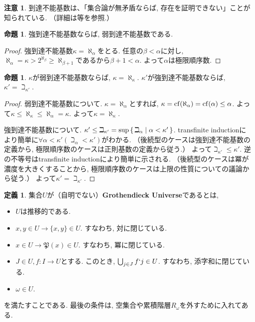\documentclass[a4paper, twoside]{bxjsarticle}
\theoremstyle{definition}
\newtheorem{prop}[thm]{命題}
\newtheorem{defn}[thm]{定義}
\newtheorem{rem}[thm]{注意}
\begin{document}
        \begin{rem}
            到達不能基数は、「集合論が無矛盾ならば, 存在を証明できない」ことが知られている. （詳細は\cite{arai}等を参照.）
        \end{rem}
        \begin{prop}
            強到達不能基数ならば, 弱到達不能基数である. 
        \end{prop}
        \begin{proof}
            強到達不能基数$\kappa=\aleph_\alpha$をとる. 任意の$\beta<\alpha$に対し, $\aleph_\alpha=\kappa>2^{\aleph_\beta}\geq \aleph_{\beta+1}$であるから$\beta+1<\alpha$. よって$\alpha$は極限順序数.     
        \end{proof}
        \begin{prop}
                $\kappa$が弱到達不能基数ならば, $\kappa=\aleph_\kappa$. $\kappa'$が強到達不能基数ならば, $\kappa'=\beth_{\kappa'}$.
        \end{prop}
        \begin{proof}
            弱到達不能基数について. $\kappa=\aleph_\alpha$とすれば, $\kappa={\rm cf}(\aleph_\alpha)={\rm cf}(\alpha)\leq\alpha$. よって$\kappa\leq\aleph_\kappa\leq\aleph_\alpha=\kappa$. よって$\kappa=\aleph_\kappa$.
            
            強到達不能基数について. $\kappa'\leq\beth_{\kappa'}={\rm sup}\set{\beth_\alpha|\alpha<\kappa'}$. transfinite inductionにより簡単に$\forall \alpha<\kappa'(\beth_\alpha<\kappa')$がわかる. （後続型のケースは強到達不能基数の定義から, 極限順序数のケースは正則基数の定義から従う.） よって$\beth_{\kappa'}\leq\kappa'$. 逆の不等号はtransfinite inductionにより簡単に示される. （後続型のケースは冪が濃度を大きくすることから, 極限順序数のケースは上限の性質についての議論から従う.） よって$\kappa'=\beth_{\kappa'}$.
        \end{proof}
        \begin{defn}
            集合$U$が（自明でない）\textbf{Grothendieck Universe}であるとは,
            \begin{itemize}
                \item $U$は推移的である.
                \item $x, y\in U \to \{x, y\}\in U$. すなわち, 対に閉じている.
                \item $x \in U\to \mathfrak{P}(x)\in U$. すなわち, 冪に閉じている.
                \item $J\in U, f\colon I\to U$とする. このとき, $\bigcup_{j\in J}f`j \in U$. すなわち, 添字和に閉じている.
                \item $\omega\in U$.
            \end{itemize}
            を満たすことである. 最後の条件は, 空集合や累積階層$R_\omega$を外すために入れてある.
        \end{defn}
\end{document}
